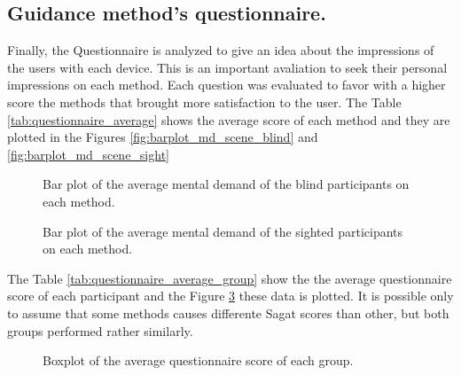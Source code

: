 \subsection{Guidance method's questionnaire.}
\label{subsec:results_questionnaires}

Finally, the Questionnaire is analyzed to give an idea about the impressions of the users with each device. This is an important avaliation to seek their personal impressions on each method. Each question was evaluated to favor with a higher score the methods that brought more satisfaction to the user. The Table \ref{tab:questionnaire_average} shows the average score of each method and they are plotted in the Figures \ref{fig:barplot_md_scene_blind} and \ref{fig:barplot_md_scene_sight}



\begin{figure}[!htb]
    \centering
    \resizebox{0.6\linewidth}{!}{
        
    }
    \caption{Bar plot of the average mental demand of the blind participants on each method.}
    \label{fig:barplot_questionnaire_scene_blind}
\end{figure}

\begin{figure}[!htb]
    \centering
    \resizebox{0.6\linewidth}{!}{
        
    }
    \caption{Bar plot of the average mental demand of the sighted participants on each method.}
    \label{fig:barplot_questionnaire_scene_sight}
\end{figure}

The Table \ref{tab:questionnaire_average_group} show the the average questionnaire score of each participant and the Figure \ref{fig:boxplot_questionnaire_scene} these data is plotted. It is possible only to assume that some methods causes differente Sagat scores than other, but both groups performed rather similarly.



\begin{figure}[!htb]
    \centering
    \resizebox{0.6\linewidth}{!}{
    
    }
    \caption{Boxplot of the average questionnaire score of each group.}
    \label{fig:boxplot_questionnaire_scene}
\end{figure}

